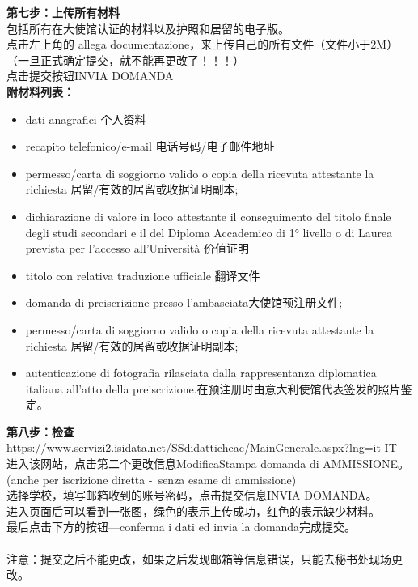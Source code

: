 \textbf{第七步：上传所有材料}\\
包括所有在大使馆认证的材料以及护照和居留的电子版。\\
点击左上角的 allega documentazione，来上传自己的所有文件（文件小于2M）\\
（一旦正式确定提交，就不能再更改了！！！）\\
点击提交按钮INVIA DOMANDA\\

\textbf{附材料列表：}\\
\begin{itemize}
\item dati anagrafici  个人资料
\item recapito telefonico/e-mail  电话号码/电子邮件地址
\item permesso/carta di soggiorno valido o copia della ricevuta attestante la richiesta  居留/有效的居留或收据证明副本;
\item dichiarazione di valore in loco attestante il conseguimento del titolo finale degli studi secondari e il del Diploma Accademico di 1° livello o di Laurea prevista per l’accesso all’Università 价值证明
\item titolo con relativa traduzione ufficiale 翻译文件
\item domanda di preiscrizione presso l’ambasciata大使馆预注册文件;
\item permesso/carta di soggiorno valido o copia della ricevuta attestante la richiesta  居留/有效的居留或收据证明副本;
\item autenticazione di fotografia rilasciata dalla rappresentanza diplomatica italiana all’atto della preiscrizione.在预注册时由意大利使馆代表签发的照片鉴定。

\end{itemize}


\textbf{第八步：检查}\\
https://www.servizi2.isidata.net/SSdidatticheac/MainGenerale.aspx?lng=it-IT\\
进入该网站，点击第二个更改信息ModificaStampa domanda di AMMISSIONE。(anche per iscrizione diretta - senza esame di ammissione)\\
选择学校，填写邮箱收到的账号密码，点击提交信息INVIA DOMANDA。\\
进入页面后可以看到一张图，绿色的表示上传成功，红色的表示缺少材料。\\
最后点击下方的按钮—conferma i dati ed invia la domanda完成提交。\\
\\
注意：提交之后不能更改，如果之后发现邮箱等信息错误，只能去秘书处现场更改。\\
\\
